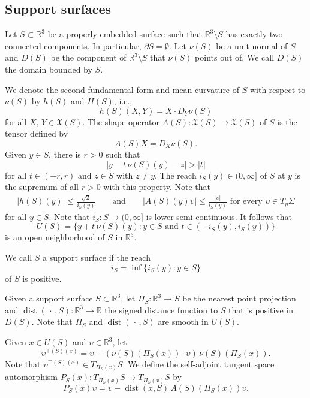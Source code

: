 \documentclass[11pt]{amsart}
\begin{document}
\begin{appendices} 
	
	\section{Support surfaces}
	\label{appendix support surfaces}
	
	Let $S\subset \mathbb{R}^3$ be a properly embedded surface  such that $\mathbb{R}^3\setminus S$ has exactly two connected components. In particular, $\partial S=\emptyset$. Let  $\nu(S)$ be a unit normal of $S$ and $D(S)$ be the component of $\mathbb{R}^3\setminus S$ that $\nu(S)$ points out of.  We call $D(S)$ the domain bounded by $S$.
	
	 We denote the second fundamental form and mean curvature of $S$ with respect to $\nu(S)$ by $h(S)$ and $H(S)$, i.e.,
	 $$
	 h(S)(X,Y)=X\cdot D_Y\nu(S)
	 $$
for all $X,\,Y\in \mathfrak{X}(S)$. The shape operator $A(S):\mathfrak{X}(S)\to \mathfrak{X}(S)$ of $S$ is the tensor defined by 
	$$
	A(S) X=D_X\nu(S).
	$$
 Given $y\in S$, there is $r>0$ such that
 $$
  |y-t\,\nu(S)(y)-z|>|t|
 $$
 for all $t\in(-r,r)$ and $z\in S$ with $z\neq y$. The reach $i_S(y)\in(0,\infty]$ of $S$ at $y$ is the supremum of all $r>0$ with this property.   Note that  
	\begin{equation} 
	\begin{aligned} \label{reach upper bound} 
	|h(S)(y)|\leq \frac{\sqrt{2}}{i_S(y)}\qquad \text{and}\qquad
	|A(S)(y)\upsilon|\leq \frac{|\upsilon|}{i_S(y)}\text{ for every $\upsilon \in T_y \Sigma$}
	\end{aligned}
	\end{equation}   
	for all $y\in S$. Note that  $i_S:S\to(0,\infty]$ is lower semi-continuous. It follows that 
	$$
	U(S)=\{y+t\,\nu(S)(y):y\in S\text{ and } t\in (-i_S(y),i_S(y))\}
	$$
	is an open neighborhood of $S$ in $\mathbb{R}^3$. 
	
	We call $S$ a support surface if the reach
	$$
	i_S=\inf\{i_S(y):y\in S\}
	$$ 
of $S$ is positive.

	Given a support surface $S\subset \mathbb{R}^3$, let  $\Pi_S:\mathbb{R}^3\to S$ be the nearest point projection and $\operatorname{dist}(\,\cdot\,,S):\mathbb{R}^3\to \mathbb{R}$ the signed distance function to $S$ that is positive in $D(S)$. Note that $\Pi_S$ and $\operatorname{dist}(\,\cdot\,,S)$  are smooth in $U(S)$.
	
	 Given $x\in U(S)$ and $\upsilon\in \mathbb{R}^3$, let $$\upsilon^{\top(S)(x)}=\upsilon-(\nu(S)(\Pi_S(x))\cdot \upsilon)\,\nu(S)(\Pi_S(x)).$$ Note that $\upsilon^{\top(S)(x)}\in T_{\Pi_S(x)}S$. We define the self-adjoint tangent space automorphism $P_S(x):T_{\Pi_S(x)}S\to T_{\Pi_S(x)}S$ by $$P_S(x)\upsilon=\upsilon-\operatorname{dist}(x,S)\,A(S)(\Pi_S(x))\upsilon.$$
	

\end{appendices}
\end{document}
